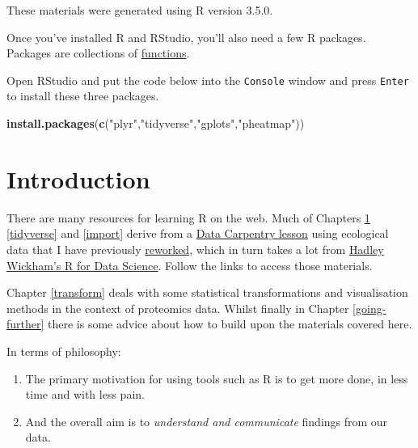\documentclass[12pt,]{book}
\newenvironment{Shaded}{\begin{snugshade}}{\end{snugshade}}
\newcommand{\KeywordTok}[1]{\textcolor[rgb]{0.13,0.29,0.53}{\textbf{#1}}}
\newcommand{\StringTok}[1]{\textcolor[rgb]{0.31,0.60,0.02}{#1}}
\newcommand{\NormalTok}[1]{#1}
\theoremstyle{definition}
\theoremstyle{definition}
\theoremstyle{definition}
\theoremstyle{remark}
\begin{document}
These materials were generated using R version 3.5.0.

Once you've installed R and RStudio, you'll also need a few R packages.
Packages are collections of
\protect\hyperlink{function-anatomy}{functions}.

Open RStudio and put the code below into the \texttt{Console} window and
press \texttt{Enter} to install these three packages.

\begin{Shaded}
\begin{Highlighting}[]
\KeywordTok{install.packages}\NormalTok{(}\KeywordTok{c}\NormalTok{(}\StringTok{"plyr"}\NormalTok{,}\StringTok{"tidyverse"}\NormalTok{,}\StringTok{"gplots"}\NormalTok{,}\StringTok{"pheatmap"}\NormalTok{))}
\end{Highlighting}
\end{Shaded}

\chapter{Introduction}\label{intro}

There are many resources for learning R on the web. Much of Chapters
\ref{intro} \ref{tidyverse} and \ref{import} derive from a
\href{http://www.datacarpentry.org/lessons/}{Data Carpentry lesson}
using ecological data that I have previously
\href{https://southampton-rsg.github.io/2017-08-01-southampton-dc/novice/R-ecology-lesson/index.html}{reworked},
which in turn takes a lot from \href{http://r4ds.had.co.nz/}{Hadley
Wickham's R for Data Science}. Follow the links to access those
materials.

Chapter \ref{transform} deals with some statistical transformations and
visualisation methods in the context of proteomics data. Whilst finally
in Chapter \ref{going-further} there is some advice about how to build
upon the materials covered here.

In terms of philosophy:

\begin{enumerate}
\def\labelenumi{\arabic{enumi}.}
\item
  The primary motivation for using tools such as R is to get more done,
  in less time and with less pain.
\item
  And the overall aim is to \emph{understand and communicate} findings
  from our data.
\end{enumerate}
\end{document}
